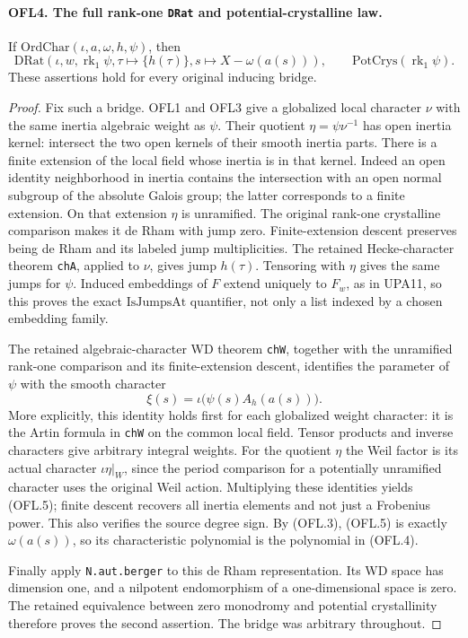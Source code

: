 \documentclass[11pt,a4paper]{article}
\numberwithin{equation}{section}
\theoremstyle{remark}\newtheorem{remark}[theorem]{Remark}
\begin{document}
\paragraph{OFL4. The full rank-one \texttt{DRat} and potential-crystalline law.}
\label{claim:OFL4}
If \(\mathrm{OrdChar}(\iota,a,\omega,h,\psi)\), then
\[
 \mathrm{DRat}\!\left(\iota,w,\operatorname{rk}_1\psi,
                 \tau\mapsto\{h(\tau)\},
                 s\mapsto X-\omega(a(s))\right),
 \qquad \mathrm{PotCrys}(\operatorname{rk}_1\psi).
 \tag{OFL.4}
\]
These assertions hold for every original inducing bridge.
\begin{proof}
Fix such a bridge.  OFL1 and OFL3 give a globalized local character
\(\nu\) with the same inertia algebraic weight as \(\psi\).
Their quotient \(\eta=\psi\nu^{-1}\) has open inertia kernel:
intersect the two open kernels of their smooth inertia parts.
There is a finite extension of the local field whose inertia is
in that kernel.  Indeed an open identity neighborhood in inertia
contains the intersection with an open normal subgroup of the
absolute Galois group; the latter corresponds to a finite extension.
On that extension \(\eta\) is unramified.  The original
rank-one crystalline comparison makes it de Rham with jump zero.
Finite-extension descent preserves being de Rham and its labeled
jump multiplicities.  The retained Hecke-character theorem
\texttt{ch\allowbreak A}, applied to \(\nu\), gives jump \(h(\tau)\).
Tensoring with \(\eta\) gives the same jumps for \(\psi\).
Induced embeddings of \(F\) extend uniquely to \(F_w\), as
in UPA11, so this proves the exact \(\mathrm{IsJumpsAt}\)
quantifier, not only a list indexed by a chosen embedding family.

The retained algebraic-character WD theorem \texttt{ch\allowbreak W}, together
with the unramified rank-one comparison and its finite-extension
descent, identifies the parameter of \(\psi\) with the smooth
character
\[
 \xi(s)=\iota\bigl(\psi(s)A_h(a(s))\bigr).
 \tag{OFL.5}
\]
More explicitly, this identity holds first for each globalized
weight character: it is the Artin formula in \texttt{ch\allowbreak W} on
the common local field.  Tensor products and inverse characters
give arbitrary integral weights.  For the quotient \(\eta\)
the Weil factor is its actual character \(\iota\eta|_W\),
since the period comparison for a potentially unramified character
uses the original Weil action.  Multiplying these identities yields
(OFL.5); finite descent recovers all inertia elements and not just
a Frobenius power.  This also verifies the source degree sign.
By (OFL.3), (OFL.5) is exactly \(\omega(a(s))\), so its
characteristic polynomial is the polynomial in (OFL.4).

Finally apply \texttt{N.\allowbreak aut.\allowbreak berger} to this de Rham representation.
Its WD space has dimension one, and a nilpotent endomorphism of a
one-dimensional space is zero.  The retained equivalence between
zero monodromy and potential crystallinity therefore proves the
second assertion.  The bridge was arbitrary throughout.
\end{proof}
\end{document}

